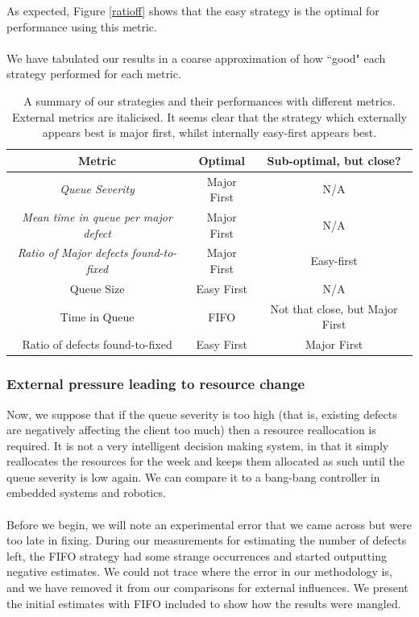 As expected, Figure \ref{ratioff} shows that the easy strategy is the optimal for performance using
this metric.\\
\\
We have tabulated our results in a coarse approximation of how ``good" each strategy performed for
each metric.

\begin{table}[ht!]
	\centering
	\begin{tabular}{|c|c|c|}
	\hline
	{\bf Metric} & {\bf Optimal} & {\bf Sub-optimal, but close?} \\ \hline
	{\em Queue Severity} & Major First & N/A \\ \hline
	{\em Mean time in queue per major defect} & Major First & N/A\\ \hline
	{\em Ratio of Major defects found-to-fixed} & Major First & Easy-first \\ \hline
	Queue Size & Easy First & N/A \\ \hline
	Time in Queue & FIFO & Not that close, but Major First \\ \hline
	Ratio of defects found-to-fixed & Easy First & Major First\\ \hline
	\end{tabular}
	\caption{A summary of our strategies and their performances with different metrics.
External metrics are italicised.
It seems clear that the strategy which externally appears best is major first, whilst internally
easy-first appears best.}
	\label{summary}
\end{table}

\subsubsection{External pressure leading to resource change}

Now, we suppose that if the queue severity is too high (that is, existing defects are negatively
affecting the client too much) then a resource reallocation is required.
It is not a very intelligent decision making system, in that it simply reallocates the resources for
the week and keeps them allocated as such until the queue severity is low again.
We can compare it to a bang-bang controller in embedded systems and robotics.\\
\\
Before we begin, we will note an experimental error that we came across but were too late in fixing.
During our measurements for estimating the number of defects left, the FIFO strategy had some
strange occurrences and started outputting negative estimates.
We could not trace where the error in our methodology is, and we have removed it from our
comparisons for external influences.
We present the initial estimates with FIFO included to show how the results were mangled.

